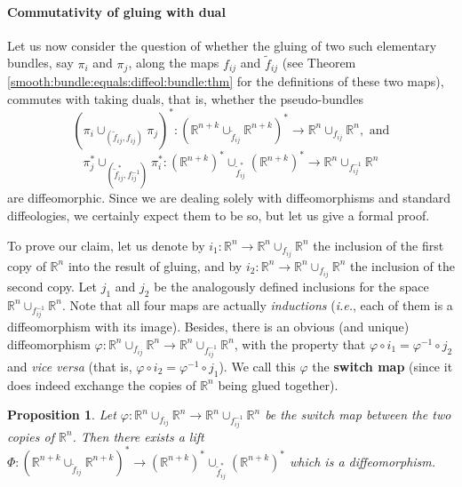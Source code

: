 \documentclass{article}
\newtheorem{prop}[lemma]{Proposition}
\newcommand\matR{{\mathbb{R}}}
\begin{document}
\paragraph{Commutativity of gluing with dual} Let us now consider the question of whether the gluing of two such elementary bundles, say $\pi_i$ and $\pi_j$, along the maps $f_{ij}$ and $\tilde{f}_{ij}$ (see 
Theorem \ref{smooth:bundle:equals:diffeol:bundle:thm} for the definitions of these two maps), commutes with taking duals, that is, whether the pseudo-bundles
$$(\pi_i\cup_{(\tilde{f}_{ij},f_{ij})}\pi_j)^*:(\matR^{n+k}\cup_{\tilde{f}_{ij}}\matR^{n+k})^*\to\matR^n\cup_{f_{ij}}\matR^n,\mbox{ and}$$
$$\pi_j^*\cup_{(\tilde{f}_{ij}^*,f_{ij}^{-1})}\pi_i^*:(\matR^{n+k})^*\cup_{\tilde{f}_{ij}^*}(\matR^{n+k})^*\to\matR^n\cup_{f_{ij}^{-1}}\matR^n$$ are diffeomorphic. Since we are dealing solely with diffeomorphisms
and standard diffeologies, we certainly expect them to be so, but let us give a formal proof.

To prove our claim, let us denote by $i_1:\matR^n\to\matR^n\cup_{f_{ij}}\matR^n$ the inclusion of the first copy of $\matR^n$ into the result of gluing, and by $i_2:\matR^n\to\matR^n\cup_{f_{ij}}\matR^n$ the 
inclusion of the second copy. Let $j_1$ and $j_2$ be the analogously defined inclusions for the space $\matR^n\cup_{f_{ij}^{-1}}\matR^n$. Note that all four maps are actually \emph{inductions} (\emph{i.e.}, 
each of them is a diffeomorphism with its image). Besides, there is an obvious (and unique) diffeomorphism $\varphi:\matR^n\cup_{f_{ij}}\matR^n\to\matR^n\cup_{f_{ij}^{-1}}\matR^n$, with the property that 
$\varphi\circ i_1=\varphi^{-1}\circ j_2$ and \emph{vice versa} (that is, $\varphi\circ i_2=\varphi^{-1}\circ j_1$). We call this $\varphi$ the \textbf{switch map} (since it does indeed exchange the copies of 
$\matR^n$ being glued together).

\begin{prop}\label{diffeological:dual:is:standard:dual:prop}
Let $\varphi:\matR^n\cup_{f_{ij}}\matR^n\to\matR^n\cup_{f_{ij}^{-1}}\matR^n$ be the switch map between the two copies of $\matR^n$. Then there exists a lift
$\Phi:(\matR^{n+k}\cup_{\tilde{f}_{ij}}\matR^{n+k})^*\to(\matR^{n+k})^*\cup_{\tilde{f}_{ij}^*}(\matR^{n+k})^*$ which is a diffeomorphism.
\end{prop}
\end{document}
